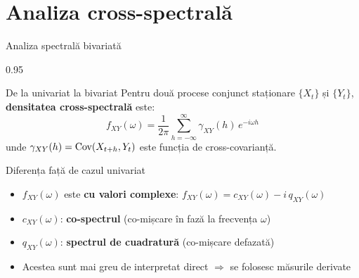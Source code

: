 \documentclass[9pt, aspectratio=169, t]{beamer}
\begin{document}
\section{Analiza cross-spectrală}

\begin{frame}{Analiza spectrală bivariată}
    \begin{cminipage}{0.95\textwidth}
    \vspace{-2mm}
    \begin{block}{De la univariat la bivariat}
        {\small Pentru două procese conjunct staționare $\{X_t\}$ și $\{Y_t\}$, \textbf{densitatea cross-spectrală} este:
        \[
            f_{XY}(\omega) = \frac{1}{2\pi}\sum_{h=-\infty}^{\infty} \gamma_{XY}(h)\,e^{-i\omega h}
        \]
        unde $\gamma_{XY}(h) = \text{Cov}(X_{t+h}, Y_t)$ este funcția de cross-covarianță.}
    \end{block}
    \vspace{-2mm}
    \begin{alertblock}{Diferența față de cazul univariat}
        \begin{itemize}\setlength{\itemsep}{0pt}
            \item $f_{XY}(\omega)$ este \textbf{cu valori complexe}: $f_{XY}(\omega) = c_{XY}(\omega) - i\,q_{XY}(\omega)$
            \item $c_{XY}(\omega)$: \textbf{co-spectrul} (co-mișcare în fază la frecvența $\omega$)
            \item $q_{XY}(\omega)$: \textbf{spectrul de cuadratură} (co-mișcare defazată)
            \item Acestea sunt mai greu de interpretat direct $\Rightarrow$ se folosesc măsurile derivate
        \end{itemize}
    \end{alertblock}
    \end{cminipage}
\end{frame}
\end{document}
